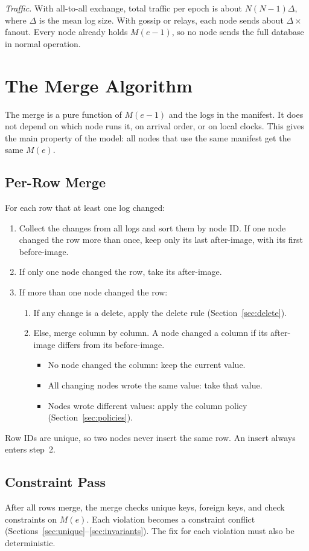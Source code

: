 \documentclass[journal]{IEEEtran}
\begin{document}
\emph{Traffic.} With all-to-all exchange, total traffic per epoch is about $N(N-1)\Delta$, where $\Delta$ is the mean log size. With gossip or relays, each node sends about $\Delta\times$fanout. Every node already holds $M(e{-}1)$, so no node sends the full database in normal operation.

\section{The Merge Algorithm}\label{sec:merge}
The merge is a pure function of $M(e{-}1)$ and the logs in the manifest. It does not depend on which node runs it, on arrival order, or on local clocks. This gives the main property of the model: all nodes that use the same manifest get the same $M(e)$.

\subsection{Per-Row Merge}
For each row that at least one log changed:
\begin{enumerate}
\item Collect the changes from all logs and sort them by node ID. If one node changed the row more than once, keep only its last after-image, with its first before-image.
\item If only one node changed the row, take its after-image.
\item If more than one node changed the row:
 \begin{enumerate}
 \item If any change is a delete, apply the delete rule (Section~\ref{sec:delete}).
 \item Else, merge column by column. A node changed a column if its after-image differs from its before-image.
  \begin{itemize}
  \item No node changed the column: keep the current value.
  \item All changing nodes wrote the same value: take that value.
  \item Nodes wrote different values: apply the column policy (Section~\ref{sec:policies}).
  \end{itemize}
 \end{enumerate}
\end{enumerate}
Row IDs are unique, so two nodes never insert the same row. An insert always enters step~2.

\subsection{Constraint Pass}
After all rows merge, the merge checks unique keys, foreign keys, and check constraints on $M(e)$. Each violation becomes a constraint conflict (Sections~\ref{sec:unique}--\ref{sec:invariants}). The fix for each violation must also be deterministic.
\end{document}
